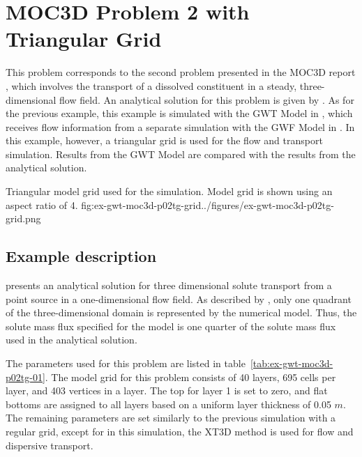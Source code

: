 \section{MOC3D Problem 2 with Triangular Grid}

This problem corresponds to the second problem presented in the MOC3D report \cite{konikow1996three}, which involves the transport of a dissolved constituent in a steady, three-dimensional flow field.  An analytical solution for this problem is given by \cite{wexler1992}.  As for the previous example, this example is simulated with the GWT Model in \mf, which receives flow information from a separate simulation with the GWF Model in \mf.  In this example, however, a triangular grid is used for the flow and transport simulation.  Results from the GWT Model are compared with the results from the \cite{wexler1992} analytical solution.

\begin{StandardFigure}{
                                     Triangular model grid used for the \mf simulation.  Model grid is shown using an aspect ratio of 4.
                                     }{fig:ex-gwt-moc3d-p02tg-grid}{../figures/ex-gwt-moc3d-p02tg-grid.png}
\end{StandardFigure}            


\subsection{Example description}

\cite{wexler1992} presents an analytical solution for three dimensional solute transport from a point source in a one-dimensional flow field.  As described by \cite{konikow1996three}, only one quadrant of the three-dimensional domain is represented by the numerical model.  Thus, the solute mass flux specified for the model is one quarter of the solute mass flux used in the analytical solution.  

The parameters used for this problem are listed in table~\ref{tab:ex-gwt-moc3d-p02tg-01}.  The model grid for this problem consists of 40 layers, 695 cells per layer, and 403 vertices in a layer.  The top for layer 1 is set to zero, and flat bottoms are assigned to all layers based on a uniform layer thickness of 0.05 $m$.  The remaining parameters are set similarly to the previous simulation with a regular grid, except for in this simulation, the XT3D method is used for flow and dispersive transport.

